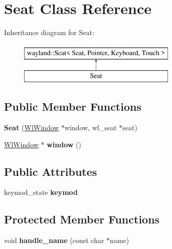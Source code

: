 \hypertarget{classSeat}{}\section{Seat Class Reference}
\label{classSeat}
Inheritance diagram for Seat\+:\begin{figure}[H]
\begin{center}
\leavevmode
\includegraphics[height=2.000000cm]{classSeat}
\end{center}
\end{figure}
\subsection*{Public Member Functions}
\begin{DoxyCompactItemize}
\item 
\mbox{\label{classSeat_a1b51d0853f4e80e3f16c58865b68fb90}} 
{\bfseries Seat} (\mbox{\hyperlink{classWlWindow}{Wl\+Window}} $\ast$window, wl\+\_\+seat $\ast$seat)
\item 
\mbox{\label{classSeat_a2683b9cc10ffc2280de956faf3958f50}} 
\mbox{\hyperlink{classWlWindow}{Wl\+Window}} $\ast$ {\bfseries window} ()
\end{DoxyCompactItemize}
\subsection*{Public Attributes}
\begin{DoxyCompactItemize}
\item 
\mbox{\label{classSeat_a615a62e43d8e2e534c76a2789339afe1}} 
keymod\+\_\+state {\bfseries keymod}
\end{DoxyCompactItemize}
\subsection*{Protected Member Functions}
\begin{DoxyCompactItemize}
\item 
\mbox{\label{classSeat_a578e3586caf650538594ab896bca0e3b}} 
void {\bfseries handle\+\_\+name} (const char $\ast$name)
\end{DoxyCompactItemize}
